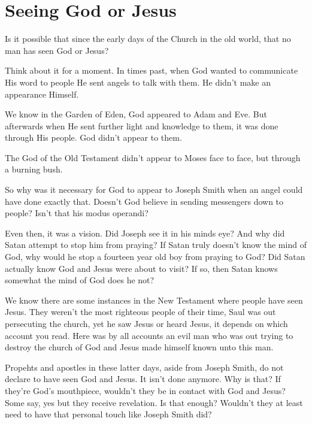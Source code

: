 \chapter{Seeing God or Jesus}

Is it possible that since the early days of the Church in the old world, that no man
has seen God or Jesus?

Think about it for a moment. In times past, when God wanted to communicate His word
to people He sent angels to talk with them. He didn't make an appearance Himself.

We know in the Garden of Eden, God appeared to Adam and Eve. But afterwards when He
sent further light and knowledge to them, it was done through His people. God didn't
appear to them.

The God of the Old Testament didn't appear to Moses face to face, but through a
burning bush.

So why was it necessary for God to appear to Joseph Smith when an angel could have
done exactly that. Doesn't God believe in sending messengers down to people? Isn't
that his modus operandi?

Even then, it was a vision. Did Joseph see it in his minds eye? And why did Satan
attempt to stop him from praying? If Satan truly doesn't know the mind of God, why
would he stop a fourteen year old boy from praying to God? Did Satan actually know
God and Jesus were about to visit? If so, then Satan knows somewhat the mind of God
does he not?

We know there are some instances in the New Testament where people have seen Jesus.
They weren't the most righteous people of their time, Saul was out persecuting the
church, yet he saw Jesus or heard Jesus, it depends on which account you read. Here
was by all accounts an evil man who was out trying to destroy the church of God and
Jesus made himself known unto this man.

Propehts and apostles in these latter days, aside from Joseph Smith, do not declare
to have seen God and Jesus. It isn't done anymore. Why is that? If they're God's
mouthpiece, wouldn't they be in contact with God and Jesus? Some say, yes but they
receive revelation. Is that enough? Wouldn't they at least need to have that personal
touch like Joseph Smith did?